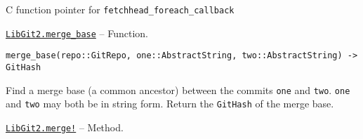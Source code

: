 \begin{adjustwidth}{2em}{0pt}

C function pointer for \texttt{fetchhead\_foreach\_callback}



\end{adjustwidth}
\hypertarget{2535753121792845073}{}
\hyperlink{2535753121792845073}{\texttt{LibGit2.merge\_base}}  -- {Function.}

\begin{adjustwidth}{2em}{0pt}


\begin{verbatim}
merge_base(repo::GitRepo, one::AbstractString, two::AbstractString) -> GitHash
\end{verbatim}

Find a merge base (a common ancestor) between the commits \texttt{one} and \texttt{two}. \texttt{one} and \texttt{two} may both be in string form. Return the \texttt{GitHash} of the merge base.



\end{adjustwidth}
\hypertarget{1187901033925205953}{}
\hyperlink{1187901033925205953}{\texttt{LibGit2.merge!}}  -- {Method.}

